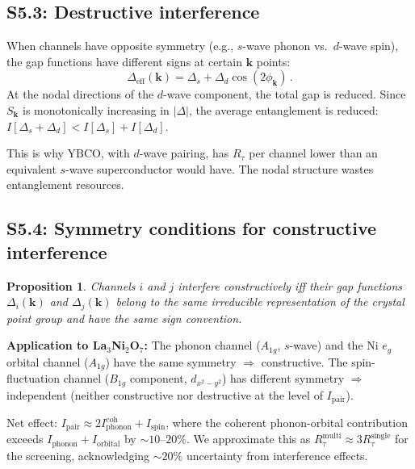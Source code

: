 \documentclass[prb,twocolumn,superscriptaddress,longbibliography,floatfix]{revtex4-2}
\newtheorem*{proposition}{Proposition}
\newcommand{\tauasym}{\tau}
\newcommand{\Ipair}{I_{\mathrm{pair}}}
\newcommand{\Rtau}{R_{\tauasym}}
\begin{document}
\subsection{S5.3: Destructive interference}

When channels have opposite symmetry (e.g., $s$-wave phonon
vs.\ $d$-wave spin), the gap functions have different signs at
certain $\bm{k}$ points:
\begin{equation}
  \Delta_{\mathrm{eff}}(\bm{k}) = \Delta_s + \Delta_d \cos(2\phi_{\bm{k}})\,.
\end{equation}
At the nodal directions of the $d$-wave component, the total
gap is reduced.  Since $S_{\bm{k}}$ is monotonically increasing
in $|\Delta|$, the average entanglement is reduced:
$I[\Delta_s + \Delta_d] < I[\Delta_s] + I[\Delta_d]$.

This is why YBCO, with $d$-wave pairing, has $\Rtau$ per channel
lower than an equivalent $s$-wave superconductor would have.
The nodal structure wastes entanglement resources.

\subsection{S5.4: Symmetry conditions for constructive interference}

\begin{proposition}
Channels $i$ and $j$ interfere constructively iff their gap
functions $\Delta_i(\bm{k})$ and $\Delta_j(\bm{k})$ belong to
the same irreducible representation of the crystal point group
and have the same sign convention.
\end{proposition}

\textbf{Application to La$_3$Ni$_2$O$_7$:}
The phonon channel ($A_{1g}$, $s$-wave) and the Ni $e_g$
orbital channel ($A_{1g}$) have the same symmetry $\Rightarrow$
constructive.  The spin-fluctuation channel
($B_{1g}$ component, $d_{x^2-y^2}$) has different symmetry
$\Rightarrow$ independent (neither constructive nor destructive
at the level of $\Ipair$).

Net effect: $\Ipair \approx 2 I_{\mathrm{phonon}}^{\mathrm{coh}}
+ I_{\mathrm{spin}}$, where the coherent phonon-orbital
contribution exceeds $I_{\mathrm{phonon}} + I_{\mathrm{orbital}}$
by $\sim 10$--$20\%$.  We approximate this as
$\Rtau^{\mathrm{multi}} \approx 3 \Rtau^{\mathrm{single}}$
for the screening, acknowledging $\sim 20\%$ uncertainty from
interference effects.

\end{document}
